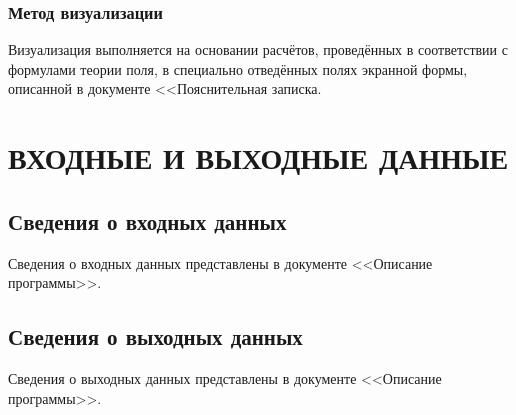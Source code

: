\documentclass[14pt,a4paper,final]{extreport}
\begin{document}
\subsection{Метод визуализации}
Визуализация выполняется на основании расчётов, проведённых в соответствии с формулами
теории поля, в специально отведённых полях экранной формы, описанной в документе <<Пояснительная записка.

\chapter{ВХОДНЫЕ И ВЫХОДНЫЕ ДАННЫЕ}

\section{Сведения о входных данных}
Сведения о входных данных представлены в документе <<Описание программы>>.

\section{Сведения о выходных данных}
Сведения о выходных данных представлены в документе <<Описание программы>>.

\pagebreak

\label{lastpage}

\end{document}
